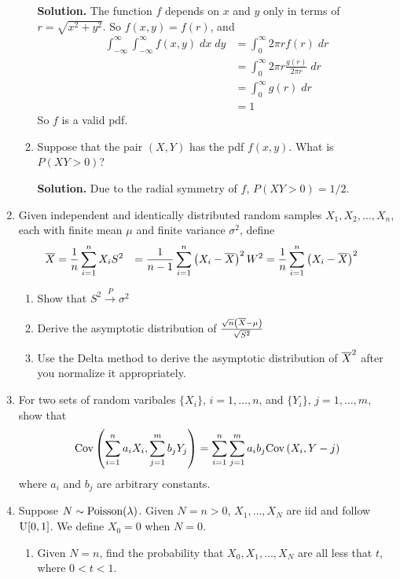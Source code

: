 \documentclass[titlepage]{article}
\begin{document}
\begin{enumerate}
\begin{enumerate}
  \textbf{Solution.} The function $f$ depends on $x$ and $y$ only in terms of  $r = \sqrt{x^2 + y^2}$. So $f(x, y) = f(r)$, and
  \[\begin{aligned}
  \int_{-\infty}^\infty \int_{-\infty}^\infty f(x, y) \; dx \; dy &= \int_0^\infty 2\pi r f(r)\; dr \\
  &= \int_0^\infty 2 \pi r \frac{g(r)}{2 \pi r} \; dr\\
  &= \int_0^\infty g(r) \; dr \\
  &= 1
  \end{aligned}\]
  So $f$ is a valid pdf.

  \item Suppose that the pair $(X, Y)$ has the pdf $f(x, y)$. What is $P(XY > 0)$?

  \textbf{Solution.} Due to the radial symmetry of $f$, $P(XY > 0) = 1/2$.
  \end{enumerate}

\item Given independent and identically distributed random samples $X_1, X_2, \ldots, X_n$, each with finite mean $\mu$ and finite variance $\sigma^2$, define
\[\begin{aligned}
\overline{X} &= \frac{1}{n} \sum_{i = 1}^n X_i
S^2 &= \frac{1}{n-1} \sum_{i = 1}^n \left(X_i - \overline{X}\right)^2
W^2 &= \frac{1}{n} \sum_{i = 1}^n \left(X_i - \overline{X}\right)^2
\end{aligned}\]
  \begin{enumerate}
  \item Show that $S^2 \xrightarrow{P} \sigma^2$
  \item Derive the asymptotic distribution of $\frac{\sqrt{n}\left(\overline{X} - \mu\right)}{\sqrt{S^2}}$
  \item Use the Delta method to derive the asymptotic distribution of $\overline{X}^2$ after you normalize it appropriately.
  \end{enumerate}

\item For two sets of random varibales $\{X_i\}$, $i = 1, \ldots, n$, and $\{Y_i\}$, $j = 1, \ldots, m$, show that
\[\text{Cov}\left( \sum_{i=1}^n a_i X_i, \sum_{j=1}^m b_j Y_j \right) = \sum_{i=1}^n \sum_{j=1}^m a_i b_j \text{Cov}\left( X_i, Y-j \right)\]
where $a_i$ and $b_j$ are arbitrary constants.

\item Suppose $N \sim \text{Poisson}(\lambda)$. Given $N = n > 0$, $X_1, \ldots, X_N$ are iid and follow $\text{U}[0, 1]$. We define $X_0 = 0$ when $N = 0$.
  \begin{enumerate}
  \item Given $N = n$, find the probability that $X_0, X_1, \ldots, X_N$ are all less that $t$, where $0 < t < 1$.


\end{enumerate}
\end{enumerate}
\end{document}
